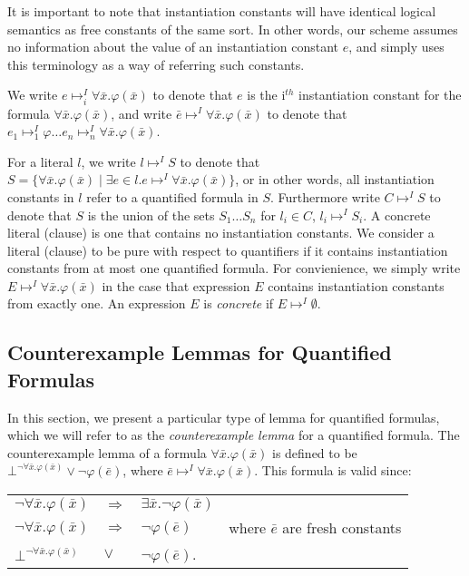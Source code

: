 \documentclass{llncs}
\begin{document}
It is important to note that instantiation constants will have identical logical semantics as free constants of the same sort.
In other words, our scheme assumes no information about the value of an instantiation constant $e$, and simply uses this terminology as a way of referring such constants.

We write $e \mapsto^I_i \forall \bar{x}. \varphi( \bar{x} )$ to denote that $e$ is the i$^{th}$ instantiation constant for the formula $\forall \bar{x}. \varphi( \bar{x} ) $, and write $\bar{e} \mapsto^I \forall \bar{x}. \varphi( \bar{x} )$ to denote that $e_1 \mapsto^I_1 \varphi \ldots e_n \mapsto^I_n \forall \bar{x}. \varphi( \bar{x} )$.

For a literal $l$, we write $l \mapsto^I S$ to denote that $S = \{ \forall \bar{x}. \varphi( \bar{x} ) \mid \exists e \in l. e \mapsto^I \forall \bar{x}. \varphi( \bar{x} ) \}$, or in other words, all instantiation constants in $l$ refer to a quantified formula in $S$.
Furthermore write $C \mapsto^I S$ to denote that $S$ is the union of the sets $S_1 \ldots S_n$ for $l_i \in C$, $l_i \mapsto^I S_i$.
A concrete literal (clause) is one that contains no instantiation constants.
We consider a literal (clause) to be pure with respect to quantifiers if it contains instantiation constants from at most one quantified formula.
For convienience, we simply write $E \mapsto^I \forall \bar{x}. \varphi( \bar{x} )$ in the case that expression $E$ contains instantiation constants from exactly one.
An expression $E$ is \emph{concrete} if $E \mapsto^I \emptyset$.

\subsection{Counterexample Lemmas for Quantified Formulas}
\label{sec:CENF}

In this section, we present a particular type of lemma for quantified formulas, which we will refer to as the \emph{counterexample lemma} for a quantified formula.
The counterexample lemma of a formula $\forall \bar{x}. \varphi( \bar{ x } )$ is defined to be $\bot^{\neg \forall \bar{x}. \varphi( \bar{x} )} \vee \neg \varphi( \bar{e} )$, where $\bar{e} \mapsto^I \forall \bar{x}. \varphi( \bar{x} )$.
This formula is valid since:

\begin{tabular}{llll}
$\neg \forall \bar{x}. \varphi( \bar{ x } )$ & $\Rightarrow$ & $\exists \bar{x}. \neg \varphi( \bar{x} )$ \\
$\neg \forall \bar{x}. \varphi( \bar{ x } )$ & $\Rightarrow$ & $\neg \varphi( \bar{e} )$  & where $\bar{e}$ are fresh constants \\
$\bot^{\neg \forall \bar{x}. \varphi( \bar{x} )}$ & $\vee$ & $\neg \varphi( \bar{e} )$. \\
\end{tabular}
\end{document}
